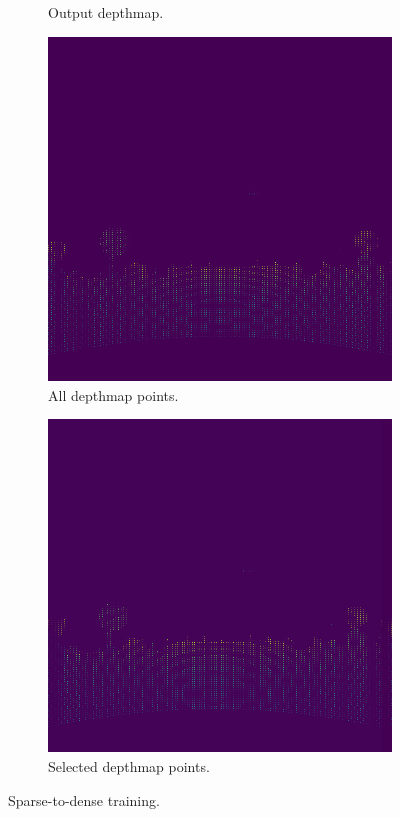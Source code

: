 \documentclass[twoside]{ctuthesis}
\theoremstyle{plain}
\theoremstyle{definition}
\theoremstyle{note}
\begin{document}
\begin{figure}
\begin{subfigure}[b]{0.4\textwidth}
		\caption{Output depthmap.}
	\end{subfigure}
	\hfill
	\begin{subfigure}[b]{0.4\textwidth}
		\centering
		\includegraphics[width=\textwidth]{s2d_all.png}
		\caption{All depthmap points.}
	\end{subfigure}
	\hfill
	\begin{subfigure}[b]{0.4\textwidth}
		\centering
		\includegraphics[width=\textwidth]{s2d_select.png}
		\caption{Selected depthmap points.}
	\end{subfigure}
	\caption{Sparse-to-dense training.}
	\label{fig:s2d_tr}
\end{figure}\\
\end{document}
